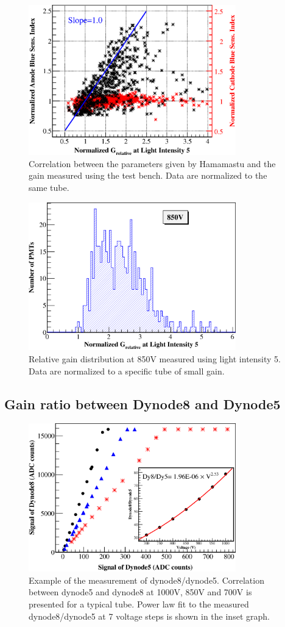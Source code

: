 \documentclass[review, times]{elsarticle}
\begin{document}
\begin{figure}
 \centering
 \includegraphics[width=90mm]{correlation_new}
\caption{Correlation between the parameters given by Hamamastu and the gain measured using the test bench.
Data are normalized to the same tube.}
\label{fig:gain_correlation}
\end{figure} 

\begin{figure}
 \centering
 \includegraphics[width=90mm]{GainDist}
\caption{Relative gain distribution at 850V measured using light intensity 5.
Data are normalized to a specific tube of small gain.}
\label{fig:gain_dist}
\end{figure}

\subsection{Gain ratio between Dynode8 and Dynode5}
\label{sec:psd_dy58}

\begin{figure}
 \centering
 \includegraphics[width=90mm]{dy58_example}
\caption{Example of the measurement of dynode8/dynode5.
Correlation between dynode5 and dynode8 at 1000V, 850V and 700V is presented for a typical tube.
Power law fit to the measured dynode8/dynode5 at 7 voltage steps is shown in the inset graph.
}
\label{fig:dy58_example}
\end{figure} 
\end{document}
